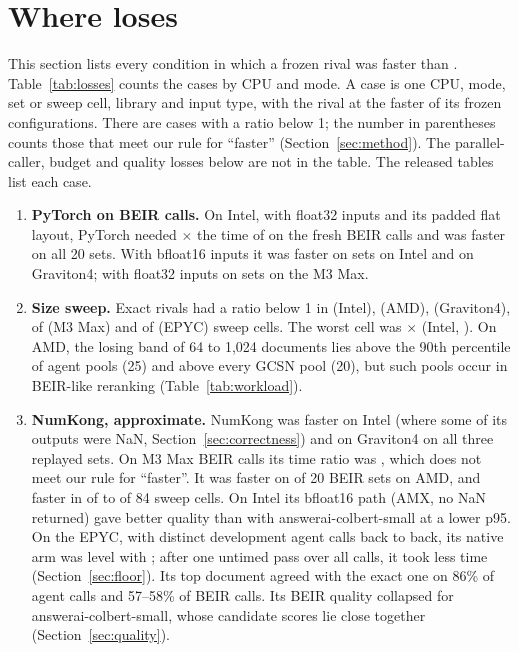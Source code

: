 \section{Where \sweet loses}
\label{sec:losses}

This section lists every condition in which a frozen rival was faster than \sweet.
Table~\ref{tab:losses} counts the cases by CPU and mode.
A case is one CPU, mode, set or sweep cell, library and input type, with the rival at the faster of its frozen configurations.
There are  cases with a ratio below 1; the number in parentheses counts those that meet our rule for ``faster'' (Section~\ref{sec:method}). The parallel-caller, budget and quality losses below are not in the table.
The released tables list each case.

\begin{enumerate}
\item \textbf{PyTorch on BEIR calls.} On Intel, with float32 inputs and its padded flat layout, PyTorch needed $\times$ the time of \sweet on the fresh BEIR calls and was faster on all 20 sets. With bfloat16 inputs it was faster on  sets on Intel and  on Graviton4; with float32 inputs on  sets on the M3 Max.
\item \textbf{Size sweep.} Exact rivals had a ratio below 1 in  (Intel),  (AMD),  (Graviton4),  of  (M3 Max) and  of  (EPYC) sweep cells. The worst cell was $\times$ (Intel, ). On AMD, the losing band of 64 to 1,024 documents lies above the 90th percentile of agent pools (25) and above every GCSN pool (20), but such pools occur in BEIR-like reranking (Table~\ref{tab:workload}).
\item \textbf{NumKong, approximate.} NumKong was faster on Intel (where some of its outputs were NaN, Section~\ref{sec:correctness}) and on Graviton4 on all three replayed sets. On M3 Max BEIR calls its time ratio was , which does not meet our rule for ``faster''. It was faster on  of 20 BEIR sets on AMD, and faster in  of  to  of 84 sweep cells. On Intel its bfloat16 path (AMX, no NaN returned) gave better quality than \sweet with answerai-colbert-small at a lower p95. On the EPYC, with distinct development agent calls back to back, its native arm was level with \sweet; after one untimed pass over all calls, it took less time (Section~\ref{sec:floor}). Its top document agreed with the exact one on 86\% of agent calls and 57--58\% of BEIR calls. Its BEIR quality collapsed for answerai-colbert-small, whose candidate scores lie close together (Section~\ref{sec:quality}).

\end{enumerate}
